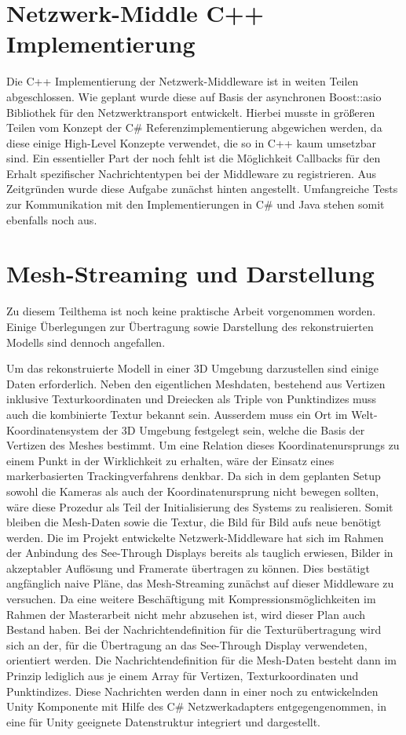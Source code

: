 \section{Netzwerk-Middle C++ Implementierung}
Die C++ Implementierung der Netzwerk-Middleware ist in weiten Teilen abgeschlossen. 
Wie geplant wurde diese auf Basis der asynchronen Boost::asio Bibliothek für den 
Netzwerktransport entwickelt. Hierbei musste in größeren Teilen vom Konzept der C\# 
Referenzimplementierung abgewichen werden, da diese einige High-Level Konzepte 
verwendet, die so in C++ kaum umsetzbar sind. Ein essentieller Part der noch fehlt 
ist die Möglichkeit Callbacks für den Erhalt spezifischer Nachrichtentypen bei der 
Middleware zu registrieren. Aus Zeitgründen wurde diese Aufgabe zunächst hinten 
angestellt. Umfangreiche Tests zur Kommunikation mit den Implementierungen in C\# 
und Java stehen somit ebenfalls noch aus.

\section{Mesh-Streaming und Darstellung}
Zu diesem Teilthema ist noch keine praktische Arbeit vorgenommen worden. Einige Überlegungen zur Übertragung sowie Darstellung des rekonstruierten Modells sind dennoch angefallen.

Um das rekonstruierte Modell in einer 3D Umgebung darzustellen sind einige Daten 
erforderlich. Neben den eigentlichen Meshdaten, bestehend aus Vertizen inklusive 
Texturkoordinaten und Dreiecken als Triple von Punktindizes muss auch die 
kombinierte Textur bekannt sein. Ausserdem muss ein Ort im Welt-Koordinatensystem 
der 3D Umgebung festgelegt sein, welche die Basis der Vertizen des Meshes bestimmt.
Um eine Relation dieses Koordinatenursprungs zu einem Punkt in der Wirklichkeit zu 
erhalten, wäre der Einsatz eines markerbasierten Trackingverfahrens denkbar. Da sich 
in dem geplanten Setup sowohl die Kameras als auch der Koordinatenursprung nicht 
bewegen sollten, wäre diese Prozedur als Teil der Initialisierung des Systems zu 
realisieren. Somit bleiben die Mesh-Daten sowie die Textur, die Bild für Bild aufs 
neue benötigt werden. Die im Projekt entwickelte Netzwerk-Middleware hat sich im 
Rahmen der Anbindung des See-Through Displays bereits als tauglich erwiesen, Bilder 
in akzeptabler Auflösung und Framerate übertragen zu können. Dies bestätigt 
angfänglich naive Pläne, das Mesh-Streaming zunächst auf dieser Middleware zu 
versuchen. Da eine weitere Beschäftigung mit Kompressionsmöglichkeiten im Rahmen der 
Masterarbeit nicht mehr abzusehen ist, wird dieser Plan auch Bestand haben. Bei der 
Nachrichtendefinition für die Texturübertragung wird sich an der, für die 
Übertragung an das See-Through Display verwendeten, orientiert werden. Die 
Nachrichtendefinition für die Mesh-Daten besteht dann im Prinzip lediglich aus je 
einem Array für Vertizen, Texturkoordinaten und Punktindizes. Diese Nachrichten 
werden dann in einer noch zu entwickelnden Unity Komponente mit Hilfe des C\# 
Netzwerkadapters entgegengenommen, in eine für Unity geeignete Datenstruktur 
integriert und dargestellt.
